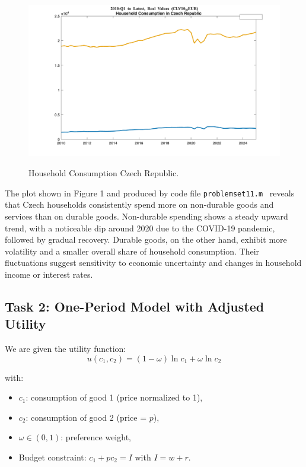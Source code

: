 \documentclass[12pt,a4paper,notitlepage]{article}
\numberwithin{equation}{section}
\begin{document}
\begin{figure} [H]
	\centering
	\includegraphics[width = 1 \textwidth]{HH Consumption_Cz.png}
	\label{fig:locally}
	\caption{Household Consumption Czech Republic.}
\end{figure}


The plot shown in Figure 1 and produced by code file \texttt{problemset11.m } reveals that Czech households consistently spend more on non-durable goods and services than on durable goods. Non-durable spending shows a steady upward trend, with a noticeable dip around 2020 due to the COVID-19 pandemic, followed by gradual recovery. Durable goods, on the other hand, exhibit more volatility and a smaller overall share of household consumption. Their fluctuations suggest sensitivity to economic uncertainty and changes in household income or interest rates.

\newpage


\subsection{Task 2: One-Period Model with Adjusted Utility}

We are given the utility function:
\[
u(c_1, c_2) = ({1-\omega}) \ln c_1 + \omega \ln c_2
\]

with:
\begin{itemize}
    \item $c_1$: consumption of good 1 (price normalized to 1),
    \item $c_2$: consumption of good 2 (price = $p$),
    \item $\omega \in (0,1)$: preference weight,
    \item Budget constraint: $c_1 + p c_2 = I$ with $I = w + r$.
\end{itemize}
\end{document}
